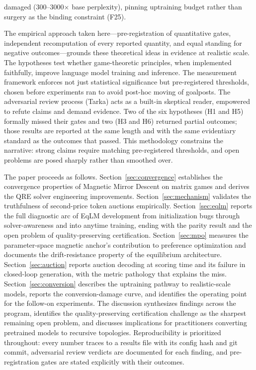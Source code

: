 damaged (300--3000$\times$ base perplexity), pinning uptraining budget rather than surgery as the binding constraint (F25).

The empirical approach taken here---pre-registration of quantitative gates, independent recomputation of every reported quantity, and equal standing for negative outcomes---grounds these theoretical ideas in evidence at realistic scale. The hypotheses test whether game-theoretic principles, when implemented faithfully, improve language model training and inference. The measurement framework enforces not just statistical significance but pre-registered thresholds, chosen before experiments ran to avoid post-hoc moving of goalposts. The adversarial review process (Tarka) acts as a built-in skeptical reader, empowered to refute claims and demand evidence. Two of the six hypotheses (H1 and H5) formally missed their gates and two (H3 and H6) returned partial outcomes; those results are reported at the same length and with the same evidentiary standard as the outcomes that passed. This methodology constrains the narrative: strong claims require matching pre-registered thresholds, and open problems are posed sharply rather than smoothed over.

The paper proceeds as follows. Section~\ref{sec:convergence} establishes the convergence properties of Magnetic Mirror Descent on matrix games and derives the QRE solver engineering improvements. Section~\ref{sec:mechanism} validates the truthfulness of second-price token auctions empirically. Section~\ref{sec:eqlm} reports the full diagnostic arc of EqLM development from initialization bugs through solver-awareness and into anytime training, ending with the parity result and the open problem of quality-preserving certification. Section~\ref{sec:mpo} measures the parameter-space magnetic anchor's contribution to preference optimization and documents the drift-resistance property of the equilibrium architecture. Section~\ref{sec:auction} reports auction decoding at scoring time and its failure in closed-loop generation, with the metric pathology that explains the miss. Section~\ref{sec:conversion} describes the uptraining pathway to realistic-scale models, reports the conversion-damage curve, and identifies the operating point for the follow-on experiments. The discussion synthesizes findings across the program, identifies the quality-preserving certification challenge as the sharpest remaining open problem, and discusses implications for practitioners converting pretrained models to recursive topologies. Reproducibility is prioritized throughout: every number traces to a results file with its config hash and git commit, adversarial review verdicts are documented for each finding, and pre-registration gates are stated explicitly with their outcomes.
